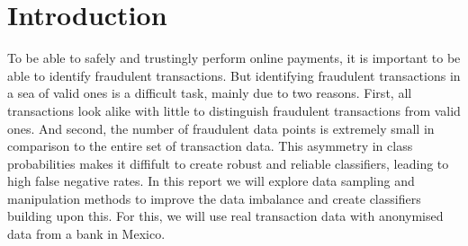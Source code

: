 \section*{Introduction}

To be able to safely and trustingly perform online payments, it is important to be able to identify fraudulent transactions. But identifying fraudulent transactions in a sea of valid ones is a difficult task, mainly due to two reasons. First, all transactions look alike with little to distinguish fraudulent transactions from valid ones. And second, the number of fraudulent data points is extremely small in comparison to the entire set of transaction data. This asymmetry in class probabilities makes it diffifult to create robust and reliable classifiers, leading to high false negative rates. In this report we will explore data sampling and manipulation methods to improve the data imbalance and create classifiers building upon this. For this, we will use real transaction data with anonymised data from a bank in Mexico.